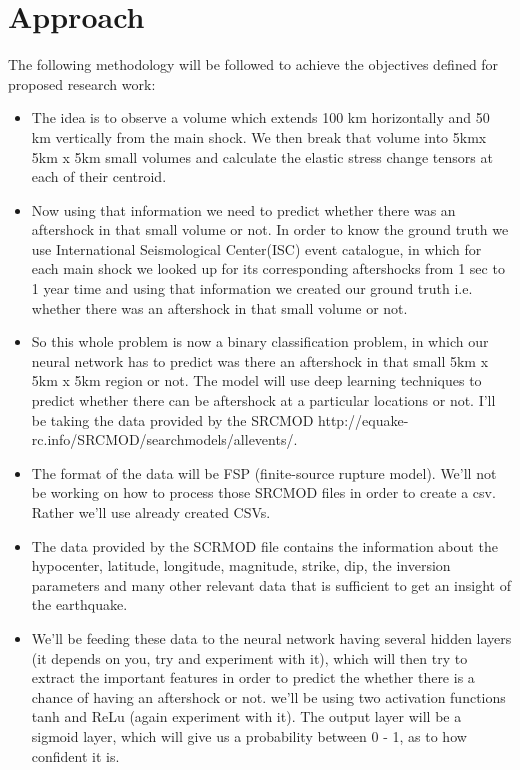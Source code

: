 \documentclass[journal,transmag]{IEEEtran}
\begin{document}
\section{Approach}
The following methodology will be followed to achieve the objectives defined for proposed
research work:
\begin{itemize}
  \item The idea is to observe a volume which extends 100 km horizontally and 50 km vertically from the main shock. We then break that volume into 5kmx 5km x 5km small volumes and calculate the elastic stress change tensors at each of their centroid.
  \item Now using that information we need to predict whether there was an aftershock in that small volume or not. In order to know the ground truth we use International Seismological Center(ISC) event catalogue, in which for each main shock we looked up for its corresponding aftershocks from 1 sec to 1 year time and using that information we created our ground truth i.e. whether there was an aftershock in that small volume or not.
  \item So this whole problem is now a binary classification problem, in which our neural network has to predict was there an aftershock in that small 5km x 5km x 5km region or not. The model will use deep learning techniques to predict whether there can be aftershock at a particular locations or not. I'll be taking the data provided by the SRCMOD http://equake-rc.info/SRCMOD/searchmodels/allevents/.
  \item The format of the data will be FSP (finite-source rupture model). We'll not be working on how to process those SRCMOD files in order to create a csv. Rather we'll use already created CSVs.
  \item The data provided by the SCRMOD file contains the information about the hypocenter, latitude, longitude, magnitude, strike, dip, the inversion parameters and many other relevant data that is sufficient to get an insight of the earthquake.
  \item We'll be feeding these data to the neural network having several hidden layers (it depends on you, try and experiment with it), which will then try to extract the important features in order to predict the whether there is a chance of having an aftershock or not. we'll be using two activation functions tanh and ReLu (again experiment with it). The output layer will be a sigmoid layer, which will give us a probability between 0 - 1, as to how confident it is.
\end{itemize}
\end{document}
